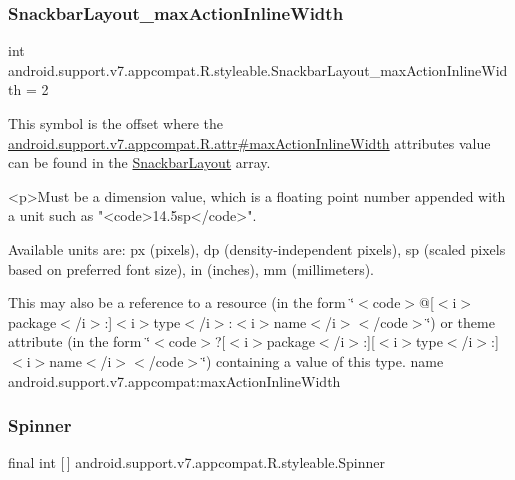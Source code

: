 \subsubsection{\texorpdfstring{Snackbar\+Layout\+\_\+max\+Action\+Inline\+Width}{SnackbarLayout\_maxActionInlineWidth}}
{\footnotesize\ttfamily int android.\+support.\+v7.\+appcompat.\+R.\+styleable.\+Snackbar\+Layout\+\_\+max\+Action\+Inline\+Width = 2\hspace{0.3cm}{\ttfamily [static]}}

This symbol is the offset where the \hyperlink{classandroid_1_1support_1_1v7_1_1appcompat_1_1R_1_1attr_a0204000e85bcf6c932950a48dfdf1553}{android.\+support.\+v7.\+appcompat.\+R.\+attr\#max\+Action\+Inline\+Width} attribute\textquotesingle{}s value can be found in the \hyperlink{classandroid_1_1support_1_1v7_1_1appcompat_1_1R_1_1styleable_a9887ec2f8bf8ba963b30b5160dcd1e61}{Snackbar\+Layout} array.

\begin{DoxyVerb}      <p>Must be a dimension value, which is a floating point number appended with a unit such as "<code>14.5sp</code>".
\end{DoxyVerb}
 Available units are\+: px (pixels), dp (density-\/independent pixels), sp (scaled pixels based on preferred font size), in (inches), mm (millimeters). 

This may also be a reference to a resource (in the form \char`\"{}$<$code$>$@\mbox{[}$<$i$>$package$<$/i$>$\+:\mbox{]}$<$i$>$type$<$/i$>$\+:$<$i$>$name$<$/i$>$$<$/code$>$\char`\"{}) or theme attribute (in the form \char`\"{}$<$code$>$?\mbox{[}$<$i$>$package$<$/i$>$\+:\mbox{]}\mbox{[}$<$i$>$type$<$/i$>$\+:\mbox{]}$<$i$>$name$<$/i$>$$<$/code$>$\char`\"{}) containing a value of this type.  name android.\+support.\+v7.\+appcompat\+:max\+Action\+Inline\+Width \mbox{\label{classandroid_1_1support_1_1v7_1_1appcompat_1_1R_1_1styleable_a63a8e6de3d44afcd176eaa79214fd8a5}} 
\subsubsection{\texorpdfstring{Spinner}{Spinner}}
{\footnotesize\ttfamily final int \mbox{[}$\,$\mbox{]} android.\+support.\+v7.\+appcompat.\+R.\+styleable.\+Spinner\hspace{0.3cm}{\ttfamily [static]}}

